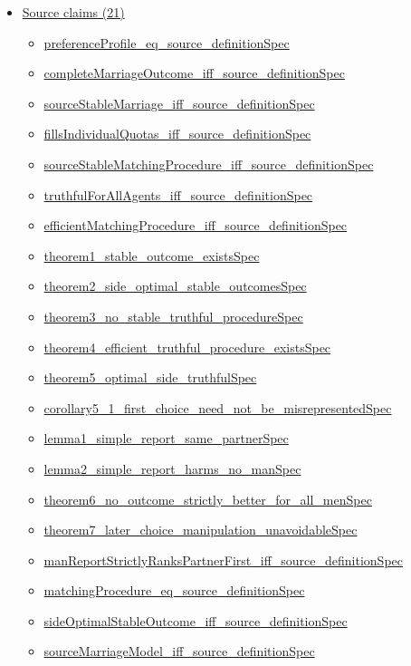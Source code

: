 \documentclass[10pt]{article}
\begin{document}
\begin{itemize}[leftmargin=1.2em]
\begin{itemize}[leftmargin=1.2em]
\end{itemize}
\item \hyperlink{source-section-f10b5f68e4acf3dc}{Source claims (21)}
\begin{itemize}[leftmargin=1.2em]
\item \hyperlink{source-claim-660a339fbfd3318f}{preferenceProfile\_eq\_source\_definitionSpec}
\item \hyperlink{source-claim-fd14fbb9277413b7}{completeMarriageOutcome\_iff\_source\_definitionSpec}
\item \hyperlink{source-claim-de65a07086fc73df}{sourceStableMarriage\_iff\_source\_definitionSpec}
\item \hyperlink{source-claim-ee021b20b26b9efe}{fillsIndividualQuotas\_iff\_source\_definitionSpec}
\item \hyperlink{source-claim-a59d544dcd58d682}{sourceStableMatchingProcedure\_iff\_source\_definitionSpec}
\item \hyperlink{source-claim-238b1f865cc8464c}{truthfulForAllAgents\_iff\_source\_definitionSpec}
\item \hyperlink{source-claim-c58c00f4b4ad6e83}{efficientMatchingProcedure\_iff\_source\_definitionSpec}
\item \hyperlink{source-claim-28dc2b89f44923a5}{theorem1\_stable\_outcome\_existsSpec}
\item \hyperlink{source-claim-e0f372cfa20685ca}{theorem2\_side\_optimal\_stable\_outcomesSpec}
\item \hyperlink{source-claim-fd8851b538d7c013}{theorem3\_no\_stable\_truthful\_procedureSpec}
\item \hyperlink{source-claim-3a4281641c18a9e6}{theorem4\_efficient\_truthful\_procedure\_existsSpec}
\item \hyperlink{source-claim-20d2db0d61f9b81c}{theorem5\_optimal\_side\_truthfulSpec}
\item \hyperlink{source-claim-b35add4c342a0889}{corollary5\_1\_first\_choice\_need\_not\_be\_misrepresentedSpec}
\item \hyperlink{source-claim-f2c197ac0692ce06}{lemma1\_simple\_report\_same\_partnerSpec}
\item \hyperlink{source-claim-46db9470e122c4fe}{lemma2\_simple\_report\_harms\_no\_manSpec}
\item \hyperlink{source-claim-c7ba28726e90028a}{theorem6\_no\_outcome\_strictly\_better\_for\_all\_menSpec}
\item \hyperlink{source-claim-775470afdcdc7bf3}{theorem7\_later\_choice\_manipulation\_unavoidableSpec}
\item \hyperlink{source-claim-f143def46edc881e}{manReportStrictlyRanksPartnerFirst\_iff\_source\_definitionSpec}
\item \hyperlink{source-claim-e79a67a30eb14eca}{matchingProcedure\_eq\_source\_definitionSpec}
\item \hyperlink{source-claim-c30c6d5e5f9f5a57}{sideOptimalStableOutcome\_iff\_source\_definitionSpec}
\item \hyperlink{source-claim-5a318a92fe832efb}{sourceMarriageModel\_iff\_source\_definitionSpec}
\end{itemize}
\end{itemize}
\end{document}
